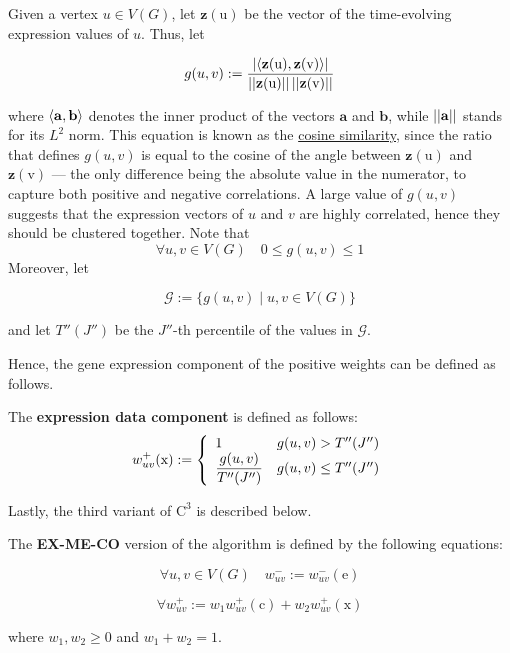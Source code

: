 Given a vertex $u \in V(G)$, let $\mathrm {\mathbf z(u)}$ be the vector of the time-evolving expression values of $u$. Thus, let

\begin{equation}
    g(u, v) := \dfrac{\abs{\abk{\mathrm{\mathbf z(u)}, \mathrm{\mathbf z(v)}}}}{\abs{\abs{\mathrm{\mathbf z(u)}}} \abs{\abs{\mathrm{\mathbf z(v)}}}}
\end{equation}

where $\abk{\mathrm{\mathbf a}, \mathrm{\mathbf b}}$ denotes the inner product of the vectors $\mathrm{\mathbf a}$ and $\mathrm{\mathbf b}$, while $\abs{\abs{\mathrm{\mathbf a}}}$ stands for its $L^2$ norm. This equation is known as the \href{https://en.wikipedia.org/wiki/Cosine_similarity}{cosine similarity}, since the ratio that defines $g(u, v)$ is equal to the cosine of the angle between $\mathrm {\mathbf z(u)}$ and $\mathrm {\mathbf z(v)}$ --- the only difference being the absolute value in the numerator, to capture both positive and negative correlations. A large value of $g(u, v)$ suggests that the expression vectors of $u$ and $v$ are highly correlated, hence they should be clustered together. Note that $$\forall u, v \in V(G) \quad 0 \le g(u, v) \le 1$$ Moreover, let

\begin{equation}
    \mathscr G := \{g(u, v) \mid u, v \in V(G)\}
\end{equation}

and let $T''(J'')$ be the $J''$-th percentile of the values in $\mathscr G$.

Hence, the gene expression component of the positive weights can be defined as follows.

\begin{definition}
    The \textbf{expression data component} is defined as follows: $$w_{uv}^+(\mathrm x) := \soe{ll}{1 & g(u, v) > T''(J'') \\ \dfrac{g(u, v)}{T''(J'')} & g(u, v) \le T''(J'')}$$
\end{definition}

Lastly, the third variant of $\mathrm{C}^3$ is described below.

\begin{definition}[EX-ME-CO]
    The \textbf{EX-ME-CO} version of the algorithm is defined by the following equations:

    \begin{equation}
        \forall u, v \in V(G) \quad w_{uv}^- := w_{uv}^-(\mathrm e)
    \end{equation}

    \begin{equation}
        \forall w_{uv}^+ := w_1 w_{uv}^+(\mathrm c) + w_2 w_{uv}^+(\mathrm x)
    \end{equation}

    where $w_1, w_2 \ge 0$ and $w_1 + w_2 = 1$.
\end{definition}

